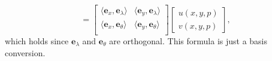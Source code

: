 \documentclass[preprint,12pt]{elsarticle}
\begin{document}
\begin{linenumbers}
\begin{equation}
	=
	\begin{bmatrix}
		\langle 	\boldsymbol{e}_x, \boldsymbol{e}_\lambda \rangle 
		& \langle 	\boldsymbol{e}_y, \boldsymbol{e}_\lambda \rangle \\
		\langle 	\boldsymbol{e}_x, \boldsymbol{e}_\theta \rangle 
		& \langle 	\boldsymbol{e}_y, \boldsymbol{e}_\theta \rangle \\
	\end{bmatrix}
	\begin{bmatrix}
		{u}(x,y,p) \\
		{v}(x,y,p)
	\end{bmatrix},
\end{equation}
which holds since $\boldsymbol{e}_{\lambda}$ and $\boldsymbol{e}_{\theta}$
are orthogonal. This formula is just a basis conversion.

\end{linenumbers}
\end{document}
